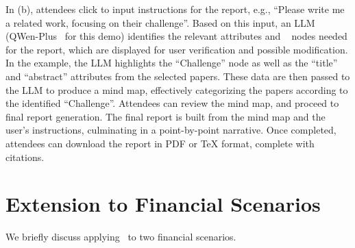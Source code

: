 In (b),  attendees click to input instructions for the report, e.g., ``Please write me a related work, focusing on their challenge''. Based on this input, an LLM (QWen-Plus~\cite{tongyi} for this demo) identifies the relevant attributes and \dimension~ nodes needed for the report, which are  displayed for user verification and possible modification. In the example, the LLM highlights the ``Challenge'' node as well as the ``title'' and ``abstract'' attributes from the selected papers.  These data are then passed to the LLM to produce a mind map, effectively categorizing the papers according to the identified ``Challenge''.   Attendees can review the mind map, and  proceed to final report generation. The final report is built from the mind map and the user’s instructions, culminating in a point-by-point narrative. Once completed,  attendees can download the report in PDF or TeX format, complete with citations.

\section{Extension to Financial Scenarios}
\label{sec:others}
We briefly discuss applying \sys\ to two financial scenarios.

